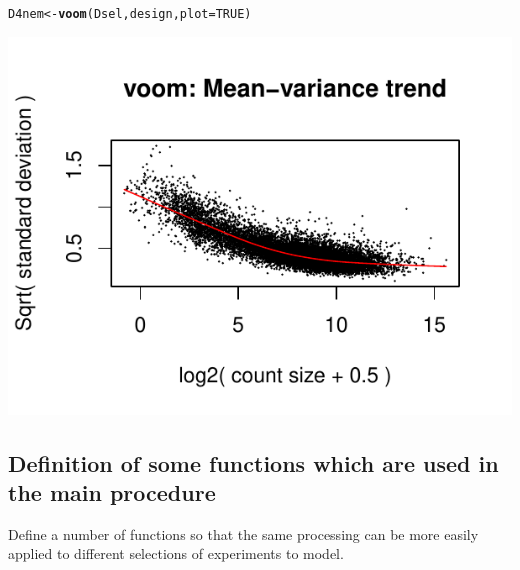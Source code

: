\documentclass[a4paper]{article}
\makeatletter
\def\maxwidth{ %
  \ifdim\Gin@nat@width>\linewidth
    \linewidth
  \else
    \Gin@nat@width
  \fi
}
\newcommand{\hlnum}[1]{\textcolor[rgb]{0.686,0.059,0.569}{#1}}%
\newcommand{\hlstd}[1]{\textcolor[rgb]{0.345,0.345,0.345}{#1}}%
\newcommand{\hlkwb}[1]{\textcolor[rgb]{0.69,0.353,0.396}{#1}}%
\newcommand{\hlkwc}[1]{\textcolor[rgb]{0.333,0.667,0.333}{#1}}%
\newcommand{\hlkwd}[1]{\textcolor[rgb]{0.737,0.353,0.396}{\textbf{#1}}}%
\newenvironment{kframe}{%
 \def\at@end@of@kframe{}%
 \ifinner\ifhmode%
  \def\at@end@of@kframe{\end{minipage}}%
  \begin{minipage}{\columnwidth}%
 \fi\fi%
 \def\FrameCommand##1{\hskip\@totalleftmargin \hskip-\fboxsep
 \colorbox{shadecolor}{##1}\hskip-\fboxsep
     \hskip-\linewidth \hskip-\@totalleftmargin \hskip\columnwidth}%
 \MakeFramed {\advance\hsize-\width
   \@totalleftmargin\z@ \linewidth\hsize
   \@setminipage}}%
 {\par\unskip\endMakeFramed%
 \at@end@of@kframe}
\newenvironment{knitrout}{}{} %
\makeatother
\begin{document}
\begin{knitrout}
\color{fgcolor}\begin{kframe}
\begin{alltt}
\hlstd{D4nem} \hlkwb{<-} \hlkwd{voom}\hlstd{(Dsel, design,} \hlkwc{plot} \hlstd{=} \hlnum{TRUE}\hlstd{)}
\end{alltt}
\end{kframe}
\includegraphics[width=\maxwidth]{figure/voomTransform} 

\end{knitrout}


\subsection*{Definition of some functions which are used in the main procedure}
Define a number of functions so that the same processing can be more easily applied to different selections of experiments to model.
\end{document}
